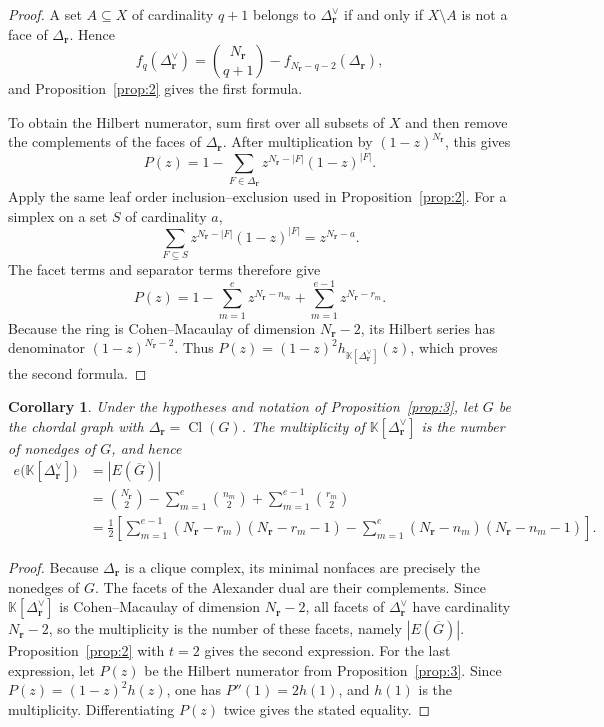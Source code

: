 \documentclass[11pt]{amsart}
\newtheorem{corollary}[theorem]{Corollary}
\theoremstyle{definition}
\theoremstyle{remark}
\newcommand{\K}{\mathbb K}
\newcommand{\SR}[1]{\K[#1]}
\begin{document}
	\begin{proof}
		A set $A\subseteq X$ of cardinality $q+1$ belongs to $\Delta_{\mathbf r}^\vee$ if and only if $X\setminus A$ is not a face of $\Delta_{\mathbf r}$. Hence
		\[
		f_q(\Delta_{\mathbf r}^\vee)
		=
		\binom{N_{\mathbf r}}{q+1}
		-f_{N_{\mathbf r}-q-2}(\Delta_{\mathbf r}),
		\]
		and Proposition~\ref{prop:2} gives the first formula.
		
		To obtain the Hilbert numerator, sum first over all subsets of $X$ and then remove the complements of the faces of $\Delta_{\mathbf r}$. After multiplication by $(1-z)^{N_{\mathbf r}}$, this gives
		\[
		P(z)
		=1-\sum_{F\in\Delta_{\mathbf r}}z^{N_{\mathbf r}-|F|}(1-z)^{|F|}.
		\]
		Apply the same leaf order inclusion--exclusion used in Proposition~\ref{prop:2}. For a simplex on a set $S$ of cardinality $a$,
		\[
		\sum_{F\subseteq S}z^{N_{\mathbf r}-|F|}(1-z)^{|F|}
		=z^{N_{\mathbf r}-a}.
		\]
		The facet terms and separator terms therefore give
		\[
		P(z)=1-\sum_{m=1}^e z^{N_{\mathbf r}-n_m}
		+\sum_{m=1}^{e-1}z^{N_{\mathbf r}-r_m}.
		\]
		Because the ring is Cohen--Macaulay of dimension $N_{\mathbf r}-2$, its Hilbert series has denominator $(1-z)^{N_{\mathbf r}-2}$. Thus $P(z)=(1-z)^2h_{\SR{\Delta_{\mathbf r}^\vee}}(z)$, which proves the second formula.
	\end{proof}
	
	\begin{corollary}\label{cor:5}
		Under the hypotheses and notation of Proposition~\ref{prop:3}, let $G$ be the chordal graph with $\Delta_{\mathbf r}=\operatorname{Cl}(G)$. The multiplicity of $\SR{\Delta_{\mathbf r}^\vee}$ is the number of nonedges of $G$, and hence
		\begin{align*}
			e\bigl(\SR{\Delta_{\mathbf r}^\vee}\bigr)
			&=|E(\overline G)|\\
			&=\binom{N_{\mathbf r}}2
			-\sum_{m=1}^{e}\binom{n_m}{2}
			+\sum_{m=1}^{e-1}\binom{r_m}{2}\\
			&=\frac12\left[
			\sum_{m=1}^{e-1}(N_{\mathbf r}-r_m)(N_{\mathbf r}-r_m-1)
			-
			\sum_{m=1}^{e}(N_{\mathbf r}-n_m)(N_{\mathbf r}-n_m-1)
			\right].
		\end{align*}
	\end{corollary}
	
	\begin{proof}
		Because $\Delta_{\mathbf r}$ is a clique complex, its minimal nonfaces are precisely the nonedges of $G$. The facets of the Alexander dual are their complements. Since $\SR{\Delta_{\mathbf r}^\vee}$ is Cohen--Macaulay of dimension $N_{\mathbf r}-2$, all facets of $\Delta_{\mathbf r}^\vee$ have cardinality $N_{\mathbf r}-2$, so the multiplicity is the number of these facets, namely $|E(\overline G)|$. Proposition~\ref{prop:2} with $t=2$ gives the second expression. For the last expression, let $P(z)$ be the Hilbert numerator from Proposition~\ref{prop:3}. Since $P(z)=(1-z)^2h(z)$, one has $P''(1)=2h(1)$, and $h(1)$ is the multiplicity. Differentiating $P(z)$ twice gives the stated equality.
	\end{proof}
	
\end{document}
